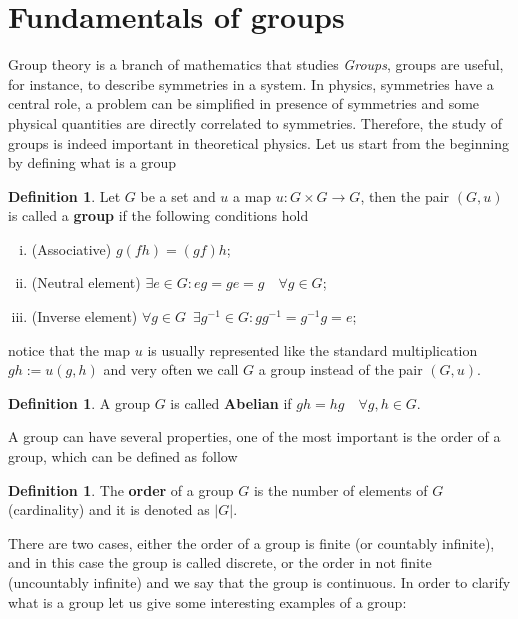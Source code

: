 \documentclass[12pt]{book}
\theoremstyle{plain}
\theoremstyle{definition}
\newtheorem{dfn}[thm]{Definition}
\theoremstyle{remark}
\begin{document}
\section{Fundamentals of groups}
Group theory is a branch of mathematics that studies \emph{Groups}, groups are useful, for instance, to describe symmetries in a system. In physics, symmetries have a central role, a problem can be simplified in presence of symmetries and some physical quantities are directly correlated to symmetries. Therefore, the study of groups is indeed important in theoretical physics.
Let us start from the beginning by defining what is a group
\begin{dfn}
Let $G$ be a set and $u$ a map $u:G\times G\to G$, then the pair $(G,u)$ is called a \textbf{group} if the following conditions hold
\begin{enumerate}[i.]
\item (Associative) $g(fh) = (gf)h$;
\item (Neutral element) $\exists e\in G: eg=ge=g\quad\forall g\in G$;
\item (Inverse element) $\forall g\in G\,$ $\exists g^{-1}\in G: gg^{-1} = g^{-1}g=e$;
\end{enumerate}
notice that the map $u$ is usually represented like the standard multiplication $gh:=u(g,h)$ and very often we call $G$ a group instead of the pair $(G,u)$.
\end{dfn}
\begin{dfn}
A group $G$ is called \textbf{Abelian} if $gh=hg\quad \forall g,h\in G$.
\end{dfn}
A group can have several properties, one of the most important is the order of a group, which can be defined as follow
\begin{dfn}
The \textbf{order} of a group $G$ is the number of elements of $G$ (cardinality) and it is denoted as $|G|$. 
\end{dfn}
There are two cases, either the order of a group is finite (or countably infinite), and in this case the group is called discrete, or the order in not finite (uncountably infinite) and we say that the group is continuous. In order to clarify what is a group let us give some interesting examples of a group:
\end{document}

